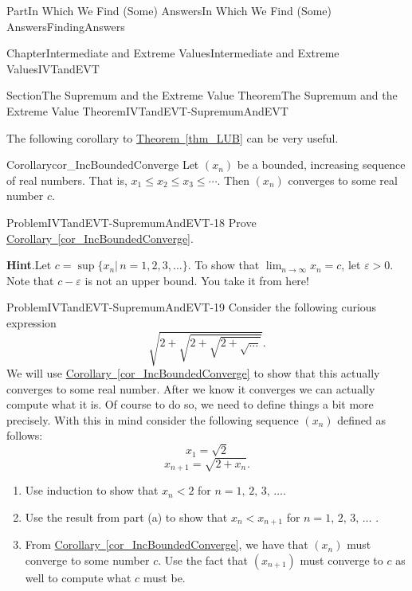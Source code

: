 \documentclass[oneside,10pt,]{book}
\newcommand{\blocktitlefont}{\relax}
\newcommand{\xreffont}{\relax}
\numberwithin{equation}{part}
\def\limit#1#2#3{{\displaystyle\lim_{#1\rightarrow #2}#3}}
\newcommand{\eps}{\varepsilon}
\newcommand{\lt}{<}
\begin{document}
\begin{partptx}{Part}{In Which We Find (Some) Answers}{}{In Which We Find (Some) Answers}{}{}{FindingAnswers}
\begin{chapterptx}{Chapter}{Intermediate and Extreme Values}{}{Intermediate and Extreme Values}{}{}{IVTandEVT}
\begin{sectionptx}{Section}{The Supremum and the Extreme Value Theorem}{}{The Supremum and the Extreme Value Theorem}{}{}{IVTandEVT-SupremumAndEVT}
\par
The following corollary to \hyperref[thm_LUB]{Theorem~{\xreffont\ref{thm_LUB}}} can be very useful.%
\begin{corollary}{Corollary}{}{}{cor_IncBoundedConverge}%
Let \((x_n)\) be a bounded, increasing sequence of real numbers. That is, \(x_1\leq x_2\leq x_3\leq\cdots\). Then \((x_n)\) converges to some real number \(c\).%
\end{corollary}
\begin{problem}{Problem}{}{IVTandEVT-SupremumAndEVT-18}%
Prove \hyperref[cor_IncBoundedConverge]{Corollary~{\xreffont\ref{cor_IncBoundedConverge}}}.%
\par\smallskip%
\noindent\textbf{\blocktitlefont Hint}.\hypertarget{IVTandEVT-SupremumAndEVT-18-3}{}\quad{}Let \(c=\sup\{x_n|\,n=1,2,3,\ldots\}\). To show that \(\limit{n}{\infty}{x_n}=c\), let \(\eps >0.\)Note that \(c-\eps \) is not an upper bound. You take it from here!%
\end{problem}
\begin{problem}{Problem}{}{IVTandEVT-SupremumAndEVT-19}%
Consider the following curious expression%
\begin{equation*}
\sqrt{2+\sqrt{2+\sqrt{2+\sqrt{...}}}}\text{.}
\end{equation*}
We will use \hyperref[cor_IncBoundedConverge]{Corollary~{\xreffont\ref{cor_IncBoundedConverge}}} to show that this actually converges to some real number. After we know it converges we can actually compute what it is. Of course to do so, we need to define things a bit more precisely. With this in mind consider the following sequence \(\left(x_n\right)\) defined as follows:%
\begin{equation*}
x_1=\sqrt{2}
\end{equation*}
%
\begin{equation*}
x_{n+1}=\sqrt{2+x_n}\text{.}
\end{equation*}
%
\begin{enumerate}[font=\bfseries,label=(\alph*),ref=\alph*]%
\item{}Use induction to show that \(x_n\lt 2\) for \(n=1,\,2,\,3,\,\ldots\).%
\item{}Use the result from part (a) to show that \(x_n\lt x_{n+1}\) for \(n=1,\,2,\,3,\,\ldots\) .%
\item{}From \hyperref[cor_IncBoundedConverge]{Corollary~{\xreffont\ref{cor_IncBoundedConverge}}}, we have that \(\left(x_n\right)\) must converge to some number \(c\). Use the fact that \(\left(x_{n+1}\right)\) must converge to \(c\) as well to compute what \(c\) must be.%

\end{enumerate}
\end{problem}
\end{sectionptx}
\end{chapterptx}
\end{partptx}
\end{document}
